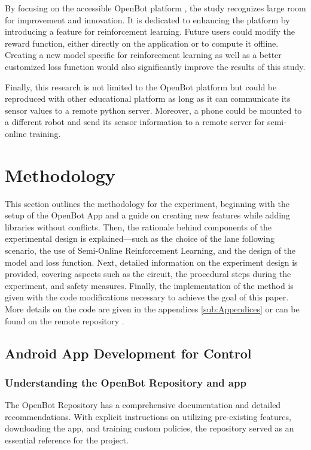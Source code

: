 \documentclass[12pt]{report}
\begin{document}
By focusing on the accessible OpenBot platform \cite{bib:openbot}, the study recognizes large room for improvement and innovation. It is dedicated to enhancing the platform by introducing a feature for reinforcement learning. Future users could modify the reward function, either directly on the application or to compute it offline. Creating a new model specific for reinforcement learning as well as a better customized loss function would also significantly improve the results of this study. 


Finally, this research is not limited to the OpenBot platform but could be reproduced with other educational platform as long as it can communicate its sensor values to a remote python server. Moreover, a phone could be mounted to a different robot and send its sensor information to a remote server for semi-online training. 
\chapter{Methodology}
\label{sub:Methodology}



This section outlines the methodology for the experiment, beginning with the setup of the OpenBot App and a guide on creating new features while adding libraries without conflicts. Then, the rationale behind components of the experimental design is explained—such as the choice of the lane following scenario, the use of Semi-Online Reinforcement Learning, and the design of the model and loss function. Next, detailed information on the experiment design is provided, covering aspects such as the circuit, the procedural steps during the experiment, and safety measures. Finally, the implementation of the method is given with the code modifications necessary to achieve the goal of this paper. More details on the code are given in the appendices \ref{sub:Appendices} or can be found on the remote repository \cite{bib:repo}.


\section{Android App Development for Control}
\label{sub:Android_app}

\subsection{Understanding the OpenBot Repository and app}
\label{sub:Understanding_openbot}
The OpenBot Repository has a comprehensive documentation and detailed recommendations. With explicit instructions on utilizing pre-existing features, downloading the app, and training custom policies, the repository served as an essential reference for the project.
\end{document}
